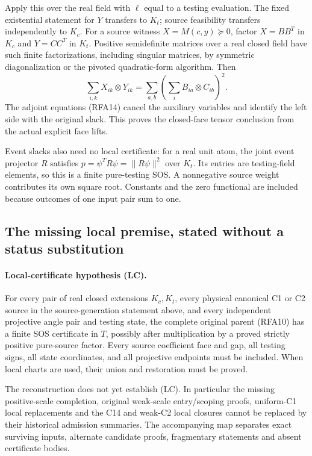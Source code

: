 Apply this over the real field with $\ell$ equal to a testing
evaluation. The fixed existential statement for $Y$ transfers to $K_t$;
source feasibility transfers independently to $K_c$. For a source
witness $X=M(c,y)\succeq0$, factor $X=BB^T$ in $K_c$ and
$Y=CC^T$ in $K_t$. Positive semidefinite matrices over a real closed
field have such finite factorizations, including singular matrices,
by symmetric diagonalization or the pivoted quadratic-form algorithm.
Then
\[
 \sum_{i,k}X_{ik}\otimes Y_{ik}
  =\sum_{a,b}\left(\sum_iB_{ia}\otimes C_{ib}\right)^2.
 \tag{RFA15}
\]
The adjoint equations (RFA14) cancel the auxiliary variables and identify
the left side with the original slack. This proves the closed-face
tensor conclusion from the actual explicit face lifts.

Event slacks also need no local certificate: for a real unit atom,
the joint event projector $R$ satisfies
$p=\psi^TR\psi=\|R\psi\|^2$ over $K_t$. Its entries are testing-field
elements, so this is a finite pure-testing SOS. A nonnegative source
weight contributes its own square root. Constants and the zero
functional are included because outcomes of one input pair sum to one.

\subsection{The missing local premise, stated without a status substitution}

\paragraph{Local-certificate hypothesis (LC).}
For every pair of real closed extensions $K_c,K_t$, every physical
canonical C1 or C2 source in the source-generation statement above,
and every independent projective angle pair and testing state, the
complete original parent (RFA10) has a finite SOS certificate in $T$,
possibly after multiplication by a proved strictly positive pure-source
factor. Every source coefficient face and gap, all testing signs,
all state coordinates, and all projective endpoints must be included.
When local charts are used, their union and restoration must be proved.

The reconstruction does not yet establish (LC). In particular the
missing positive-scale completion, original weak-scale entry/scoping
proofs, uniform-C1 local replacements and the C14 and weak-C2 local
closures cannot be replaced by their historical admission summaries.
The accompanying map separates exact surviving inputs, alternate
candidate proofs, fragmentary statements and absent certificate bodies.

